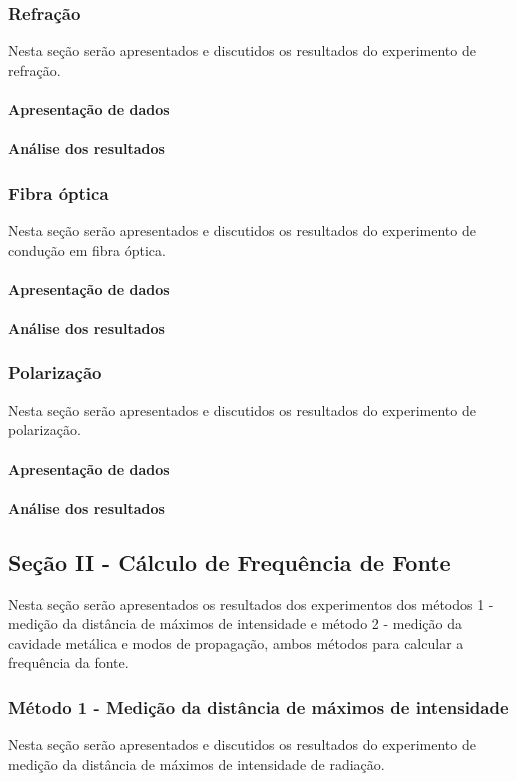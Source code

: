 \documentclass[12pt]{article}
\begin{document}
\subsubsection{Refração}
Nesta seção serão apresentados e discutidos os resultados do experimento de
refração.
\paragraph{Apresentação de dados}
\paragraph{Análise dos resultados}

\subsubsection{Fibra óptica}
Nesta seção serão apresentados e discutidos os resultados do experimento de
condução em fibra óptica.
\paragraph{Apresentação de dados}
\paragraph{Análise dos resultados}

\subsubsection{Polarização}
Nesta seção serão apresentados e discutidos os resultados do experimento de
polarização.
\paragraph{Apresentação de dados}
\paragraph{Análise dos resultados}

\subsection{Seção II - Cálculo de Frequência de Fonte}
Nesta seção serão apresentados os resultados dos experimentos dos
métodos 1 - medição da distância de máximos de intensidade e método 2 -
medição da cavidade metálica e modos de propagação, ambos métodos
para calcular a frequência da fonte.
\subsubsection{Método 1 - Medição da distância de máximos de intensidade}
Nesta seção serão apresentados e discutidos os resultados do experimento de
medição da distância de máximos de intensidade de radiação.
\end{document}
